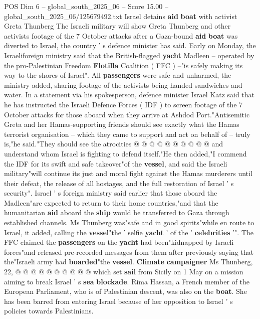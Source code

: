 \begin{textsample}{POS Dim 6 – global\_south\_2025\_06 – Score 15.00 – global\_south\_2025\_06/125679492.txt}  \label{ex:f6_pos_009}
Israel detains \textbf{aid} \textbf{boat} with activist Greta Thunberg The Israeli military will show Greta Thunberg and other activists footage of the 7 October attacks after a Gaza-bound \textbf{aid} \textbf{boat} was diverted to Israel, the country ' s defence minister has said.
Early on Monday, the Israeliforeign ministry said that the British-flagged \textbf{yacht} Madleen -- operated by the pro-Palestinian Freedom \textbf{Flotilla} Coalition ( FFC ) --"is safely making its way to the shores of Israel".
All \textbf{passengers} were safe and unharmed, the ministry added, sharing footage of the activists being handed sandwiches and water.
In a statement via his spokesperson, defence minister Israel Katz said that he has instructed the Israeli Defence Forces ( IDF ) to screen footage of the 7 October attacks for those aboard when they arrive at Ashdod Port."Antisemitic Greta and her Hamas-supporting friends should see exactly what the Hamas terrorist organisation -- which they came to support and act on behalf of -- truly is,"he said."They should see the atrocities @ @ @ @ @ @ @ @ @ @ and understand whom Israel is fighting to defend itself."He then added,"I commend the IDF for its swift and safe takeover"of the \textbf{vessel}, and said the Israeli military"will continue its just and moral fight against the Hamas murderers until their defeat, the release of all hostages, and the full restoration of Israel ' s security".
Israel ' s foreign ministry said earlier that those aboard the Madleen"are expected to return to their home countries,"and that the humanitarian \textbf{aid} aboard the \textbf{ship} would be transferred to Gaza through established channels.
Ms Thunberg was"safe and in good spirits"while en route to Israel, it added, calling the \textbf{vessel}"the ' selfie \textbf{yacht} ' of the ' \textbf{celebrities} '".
The FFC claimed the \textbf{passengers} on the \textbf{yacht} had been"kidnapped by Israeli forces"and released pre-recorded messages from them after previously saying that the"Israeli army had \textbf{boarded}"the \textbf{vessel}. \textbf{Climate} \textbf{campaigner} Ms Thunberg, 22, @ @ @ @ @ @ @ @ @ @ which set \textbf{sail} from Sicily on 1 May on a mission aiming to break Israel ' s \textbf{sea} \textbf{blockade}.
Rima Hassan, a French member of the European Parliament, who is of Palestinian descent, was also on the \textbf{boat}.
She has been barred from entering Israel because of her opposition to Israel ' s policies towards Palestinians.

\end{textsample}
